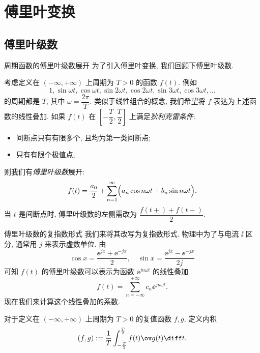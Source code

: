 \section{傅里叶变换}

\subsection{傅里叶级数}

\begin{frame}{周期函数的傅里叶级数展开}
	\onslide<+->
	为了引入傅里叶变换, 我们回顾下傅里叶级数.

	\onslide<+->
	考虑定义在 $(-\infty,+\infty)$ 上周期为 $T>0$ 的函数 $f(t)$.
	\onslide<+->
	例如
	\[
		1,\sin{\omega t},\cos{\omega t},
		\sin{2\omega t},\cos{2\omega t},
		\sin{3\omega t},\cos{3\omega t},\dots
	
	\]
	的周期都是 $T$, 其中 $\omega=\dfrac{2\pi}T$.
	\onslide<+->
	类似于线性组合的概念, 我们希望将 $f$ 表达为上述函数的线性叠加.
	\onslide<+->
	如果 $f(t)$ 在 $\left[-\dfrac T2,\dfrac T2\right]$ 上满足\emph{狄利克雷条件}:
	\begin{itemize}
		\item 间断点只有有限多个, 且均为第一类间断点;
		\item 只有有限个极值点,
	\end{itemize}
	\onslide<+->
	则我们有\emph{傅里叶级数}展开:
	\[f(t)=\frac{a_0}2+\sum_{n=1}^\infty \Bigl(a_n\cos n\omega t+b_n \sin n\omega t\Bigr).
	\]
	\onslide<+->
	当 $t$ 是间断点时, 傅里叶级数的左侧需改为 $\dfrac{f(t+)+f(t-)}2$.
\end{frame}


\begin{frame}{傅里叶级数的复指数形式}
	\onslide<+->
	我们来将其改写为复指数形式.
	\onslide<+->
	物理中为了与电流 $\ii$ 区分, 通常用 $j$ 来表示虚数单位.
	\onslide<+->
	由
	\[\cos x=\frac{\ee^{jx}+\ee^{-jx}}2,\quad \sin x=\frac{\ee^{jx}-\ee^{-jx}}{2j}
	\]
	\onslide<+->
	可知 $f(t)$ 的傅里叶级数可以表示为函数 $\ee^{jn\omega t}$ 的线性叠加
	\[
		f(t)=\sum_{n=-\infty}^{+\infty}c_n\ee^{jn\omega t}.
	
	\]
	\onslide<+->
	现在我们来计算这个线性叠加的系数.

	\onslide<+->
	对于定义在 $(-\infty,+\infty)$ 上周期为 $T>0$ 的\alert{复值}函数 $f,g$, 定义内积
	\[(f,g):=\frac1T\int_{-\frac T2}^{\frac T2} f(t)\ov g(t)\diff t.
	\]
\end{frame}



